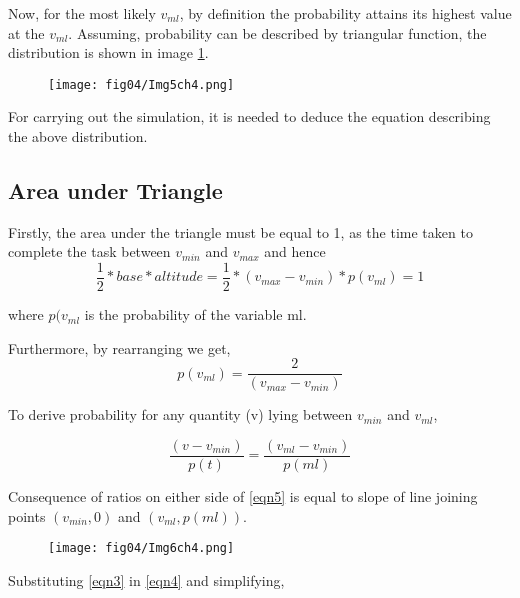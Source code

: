 Now, for the most likely $v_ {ml}$, by definition the probability attains its highest value at the $v_ {ml}$. Assuming, probability can be described by triangular function, the distribution is shown in image \ref{img5ch4}.

\begin{figure}
	\centering
	\texttt{[image: fig04/Img5ch4.png]}
	\label{img5ch4}
\end{figure}

For carrying out the simulation, it is needed to deduce the equation describing the above distribution.


\subsection{Area under Triangle}

Firstly, the area under the triangle must be equal to 1, as the time taken to complete the task between $ v_{min} $ and $ v_{max} $ and hence 
\begin{equation}
\frac{1}{2} * base * altitude = \frac{1}{2} * (v_{max} - v_{min} ) * p(v_{ml}) = 1
\label{eqn3}
\end{equation}

where $p(v_{ml} $ is the probability of the variable ml.

Furthermore, by rearranging we get, 
\begin{equation}
p(v_{ml}) = \frac{2}{  (v_{max} - v_{min})} 
\label{eqn4}
\end{equation}

To derive probability for any quantity (v) lying between $ v_{min} $ and $ v_{ml} $, 

\begin{equation}
\frac{(v - v_{min})}{ p(t) }  = \frac{(v_{ml} - v_{min})}{ p(ml) } 
\label{eqn5}
\end{equation}

Consequence of ratios on either side of \ref{eqn5} is equal to slope of line joining points $(v_{min}, 0)$ and $( v_{ml}, p(ml) )$.

\begin{figure}
	\centering
	\texttt{[image: fig04/Img6ch4.png]}
	\label{img6ch4}
\end{figure}


Substituting \ref{eqn3} in \ref{eqn4} and simplifying,

